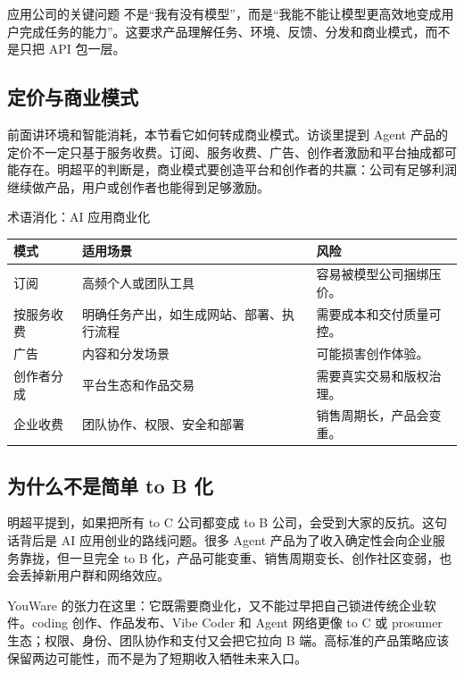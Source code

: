 \documentclass[a4paper]{article}
\begin{document}
\begin{importantbox}{应用公司的关键问题}
不是“我有没有模型”，而是“我能不能让模型更高效地变成用户完成任务的能力”。这要求产品理解任务、环境、反馈、分发和商业模式，而不是只把 API 包一层。
\end{importantbox}

\subsection{定价与商业模式}

前面讲环境和智能消耗，本节看它如何转成商业模式。访谈里提到 Agent 产品的定价不一定只基于服务收费。订阅、服务收费、广告、创作者激励和平台抽成都可能存在。明超平的判断是，商业模式要创造平台和创作者的共赢：公司有足够利润继续做产品，用户或创作者也能得到足够激励。

\begin{knowledgebox}{术语消化：AI 应用商业化}
\noindent\begin{tabularx}{\textwidth}{p{}p{}X}
\toprule
模式 & 适用场景 & 风险 \\
\midrule
订阅 & 高频个人或团队工具 & 容易被模型公司捆绑压价。 \\
按服务收费 & 明确任务产出，如生成网站、部署、执行流程 & 需要成本和交付质量可控。 \\
广告 & 内容和分发场景 & 可能损害创作体验。 \\
创作者分成 & 平台生态和作品交易 & 需要真实交易和版权治理。 \\
企业收费 & 团队协作、权限、安全和部署 & 销售周期长，产品会变重。 \\
\bottomrule
\end{tabularx}
\end{knowledgebox}

\subsection{为什么不是简单 to B 化}

明超平提到，如果把所有 to C 公司都变成 to B 公司，会受到大家的反抗。这句话背后是 AI 应用创业的路线问题。很多 Agent 产品为了收入确定性会向企业服务靠拢，但一旦完全 to B 化，产品可能变重、销售周期变长、创作社区变弱，也会丢掉新用户群和网络效应。

YouWare 的张力在这里：它既需要商业化，又不能过早把自己锁进传统企业软件。coding 创作、作品发布、Vibe Coder 和 Agent 网络更像 to C 或 prosumer 生态；权限、身份、团队协作和支付又会把它拉向 B 端。高标准的产品策略应该保留两边可能性，而不是为了短期收入牺牲未来入口。
\end{document}
